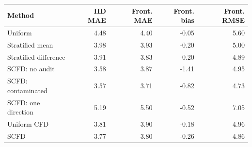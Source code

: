 \begin{tabular}{lrrrr}
\toprule
Method & IID MAE & Front. MAE & Front. bias & Front. RMSE \\
\midrule
Uniform & 4.48 & 4.40 & -0.05 & 5.60 \\
Stratified mean & 3.98 & 3.93 & -0.20 & 5.00 \\
Stratified difference & 3.91 & 3.83 & -0.20 & 4.89 \\
SCFD: no audit & 3.58 & 3.87 & -1.41 & 4.95 \\
SCFD: contaminated & 3.57 & 3.71 & -0.82 & 4.73 \\
SCFD: one direction & 5.19 & 5.50 & -0.52 & 7.05 \\
Uniform CFD & 3.81 & 3.90 & -0.18 & 4.96 \\
SCFD & 3.77 & 3.80 & -0.26 & 4.86 \\
\bottomrule
\end{tabular}
